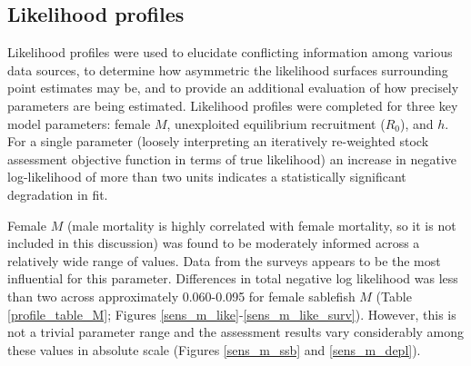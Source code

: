 \documentclass[11pt,
  english,
  a4paper,
]{article}
\begin{document}

\hypertarget{likelihood-profiles}{%
\subsection{Likelihood profiles}\label{likelihood-profiles}}

\leavevmode\tagmcend\tagstructend


Likelihood profiles were used to elucidate conflicting information among various data sources, to determine how asymmetric the likelihood surfaces surrounding point estimates may be, and to provide an additional evaluation of how precisely parameters are being estimated. Likelihood profiles were completed for three key model parameters: female {\(M\)\leavevmode\tagmcend\tagstructend}, unexploited equilibrium recruitment ({\(R_0\)\leavevmode\tagmcend\tagstructend}), and {\(h\)\leavevmode\tagmcend\tagstructend}. For a single parameter (loosely interpreting an iteratively re-weighted stock assessment objective function in terms of true likelihood) an increase in negative log-likelihood of more than two units indicates a statistically significant degradation in fit.

\leavevmode\tagmcend\tagstructend\par


Female {\(M\)\leavevmode\tagmcend\tagstructend} (male mortality is highly correlated with female mortality, so it is not included in this discussion) was found to be moderately informed across a relatively wide range of values. Data from the surveys appears to be the most influential for this parameter. Differences in total negative log likelihood was less than two across approximately 0.060-0.095 for female sablefish {\(M\)\leavevmode\tagmcend\tagstructend} (Table \ref{profile_table_M}; Figures \ref{sens_m_like}-\ref{sens_m_like_surv}). However, this is not a trivial parameter range and the assessment results vary considerably among these values in absolute scale (Figures \ref{sens_m_ssb} and \ref{sens_m_depl}).
\end{document}
